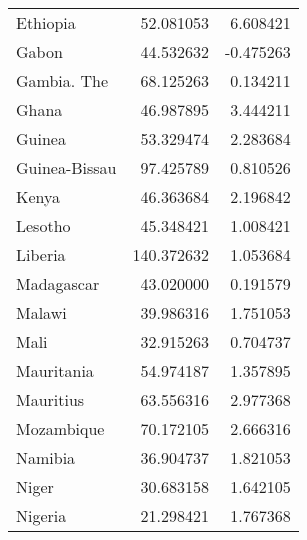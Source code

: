 \begin{tabular}{lrr}
Ethiopia                 &                         52.081053 &                                6.608421 \\
Gabon                    &                         44.532632 &                               -0.475263 \\
Gambia. The              &                         68.125263 &                                0.134211 \\
Ghana                    &                         46.987895 &                                3.444211 \\
Guinea                   &                         53.329474 &                                2.283684 \\
Guinea-Bissau            &                         97.425789 &                                0.810526 \\
Kenya                    &                         46.363684 &                                2.196842 \\
Lesotho                  &                         45.348421 &                                1.008421 \\
Liberia                  &                        140.372632 &                                1.053684 \\
Madagascar               &                         43.020000 &                                0.191579 \\
Malawi                   &                         39.986316 &                                1.751053 \\
Mali                     &                         32.915263 &                                0.704737 \\
Mauritania               &                         54.974187 &                                1.357895 \\
Mauritius                &                         63.556316 &                                2.977368 \\
Mozambique               &                         70.172105 &                                2.666316 \\
Namibia                  &                         36.904737 &                                1.821053 \\
Niger                    &                         30.683158 &                                1.642105 \\
Nigeria                  &                         21.298421 &                                1.767368 \\

\end{tabular}

